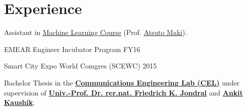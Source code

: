 \documentclass[]{deedy-resume}
\begin{document}
%
%
\lastupdated

%
%
%
%

\begin{minipage}[t]{0.54\textwidth}

\section{Experience}

Assistant in \href{https://www.kth.se/social/course/DD2431/}{Machine Learning Course} (Prof. \href{http://www.csc.kth.se/~atsuto/}{Atsuto Maki}).
\sectionsep

\vspace{\topsep} %
EMEAR Engineer Incubator Program FY16
\sectionsep

Smart City Expo World Comgres (SCEWC) 2015
\sectionsep

Bachelor Thesis in the \textbf{\href{https://www.cel.kit.edu/english/}{Communications Engineering Lab (CEL)}} under supervision of \textbf{\href{https://www.cel.kit.edu/english/team_jondral.php}{Univ.-Prof. Dr. rer.nat. Friedrich K. Jondral}} and \textbf{\href{https://www.cel.kit.edu/english/team_1316.php}{Ankit Kaushik}}.

\sectionsep




\end{minipage}
\end{document}
